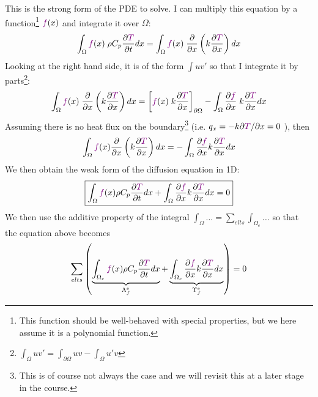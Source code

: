 This is the {\color{olive}strong form} of the PDE to solve. 
I can multiply this equation by a function\footnote{This function should be well-behaved with 
special properties, but we here assume it is a polynomial function.} ${\color{violet}f}(x)$ 
and integrate it over $\Omega$:
\begin{equation}
\int_{\Omega} {\color{violet}f}(x) \;  \rho C_p\frac{\partial {\color{violet}T}}{\partial t} dx
=
\int_{\Omega} {\color{violet}f}(x) \;  \frac{\partial }{\partial x} \left( k \frac{\partial {\color{violet}T}}{\partial x}  \right) dx
\end{equation}
Looking at the right hand side, it is of the form $\int u v'$ so that I 
integrate it by parts\footnote{$\int_\Omega uv' = \int_{\partial\Omega} uv - \int_\Omega u'v$}:
\begin{equation}
\int_{\Omega} {\color{violet}f}(x) \;  \frac{\partial }{\partial x} 
\left( k \frac{\partial {\color{violet}T}}{\partial x}  \right) dx
=
\left[
 {\color{violet}f}(x) \;  k \frac{\partial {\color{violet}T}}{\partial x}
\right]_{\partial \Omega}
-
\int_{\Omega} \frac{\partial {\color{violet}f}}{\partial x} \;   k \frac{\partial {\color{violet}T}}{\partial x}  dx
\end{equation}
Assuming there is no heat flux on the boundary\footnote{This is of course not always the case
and we will revisit this at a later stage in the course.} (i.e. $q_x= - k \partial {\color{violet}T}/\partial x = 0$ ), then
\begin{equation}
\int_{\Omega} {\color{violet}f}(x) \frac{\partial }{\partial x} \left( k \frac{\partial {\color{violet}T}}{\partial x}  
\right) dx
=
- \int_{\Omega} \frac{\partial {\color{violet}f}}{\partial x}  k \frac{\partial {\color{violet}T}}{\partial x}  dx
\end{equation}
We then obtain the {\color{olive}weak form} of the diffusion equation in 1D:
\begin{equation}
\boxed{
\int_{\Omega} {\color{violet}f}(x) \rho C_p \frac{\partial {\color{violet}T}}{\partial t} dx
+
\int_{\Omega} \frac{\partial {\color{violet}f}}{\partial x}  k \frac{\partial {\color{violet}T}}{\partial x}  dx = 0
}
\end{equation}
We then use the additive property of the integral 
$\int_\Omega \dots = \sum\limits_{elts} \int_{\Omega_e} \dots$
so that the equation above becomes 
\begin{equation}
\sum_{elts} \left(     
\underbrace{ \int_{\Omega_e} {\color{violet}f}(x) \rho C_p   \frac{\partial {\color{violet}T}}{\partial t} dx }_{{\Lambda}_f^e}
+
\underbrace{\int_{\Omega_e} \frac{\partial {\color{violet}f}}{\partial x}  k \frac{\partial {\color{violet}T}}{\partial x}  dx}_{{\Upsilon}_f^e}      \right) = 0  
\end{equation}


